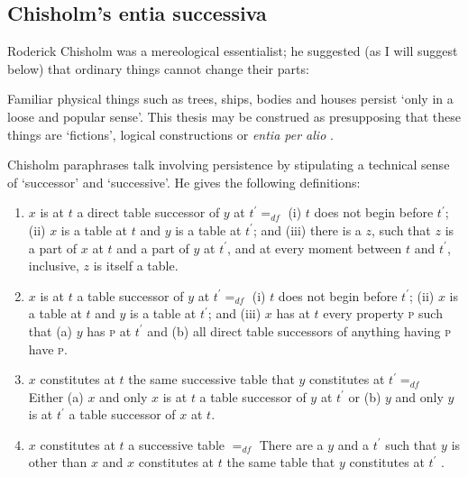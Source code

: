 \documentclass[11pt]{article}
\newenvironment{squote}{%
\begin{spacing}{1}
\begin{list}{}{%
\setlength{\labelwidth}{0pt}%
\rightmargin\leftmargin%
}
\item\relax
}{%
\end{list}%
\end{spacing}
}
\begin{document}
\begin{spacing}{1.5}
\subsection{Chisholm's entia successiva}
\label{chisholm}
Roderick Chisholm was a mereological essentialist; he suggested (as I
will suggest below) that ordinary things cannot change their parts:

\begin{squote}
Familiar physical things such as trees, ships, bodies and houses
persist `only in a loose and popular sense'.  This thesis may be
construed as presupposing that these things are `fictions', logical
constructions or {\em entia per alio} \citeyearpar[97]{chisholm1979}.
\end{squote}

Chisholm paraphrases talk involving persistence by stipulating a
technical sense of `successor' and `successive'.  He gives the
following definitions:

\begin{enumerate}[ref=(\arabic*)]
  \item $x$ is at $t$ a direct table successor of $y$ at $t^{\prime}
    =_{df}$ (i) $t$ does not begin before $t^{\prime}$; (ii) $x$ is a
    table at $t$ and $y$ is a table at $t^{\prime}$; and (iii) there
    is a $z$, such that $z$ is a part of $x$ at $t$ and a part of $y$
    at $t^{\prime}$, and at every moment between $t$ and $t^{\prime}$,
    inclusive, $z$ is itself a table.
  \item $x$ is at $t$ a table successor of $y$ at $t^{\prime} =_{df}$
    (i) $t$ does not begin before $t^{\prime}$; (ii) $x$ is a table at
    $t$ and $y$ is a table at $t^{\prime}$; and (iii) $x$ has at $t$
    every property \textsc{p} such that (a) $y$ has \textsc{p} at
    $t^{\prime}$ and (b) all direct table successors of anything
    having \textsc{p} have \textsc{p}.
  \item $x$ constitutes at $t$ the same successive table that $y$
    constitutes at $t^{\prime} =_{df}$ Either (a) $x$ and only $x$ is
    at $t$ a table successor of $y$ at $t^{\prime}$ or (b) $y$ and
    only $y$ is at $t^{\prime}$ a table successor of $x$ at $t$.
  \item $x$ constitutes at $t$ a successive table $=_{df}$ There are a
    $y$ and a $t^{\prime}$ such that $y$ is other than $x$ and $x$
    constitutes at $t$ the same table that $y$ constitutes at
    $t^{\prime}$ \citep[99--100]{chisholm1979}.
\end{enumerate}


\end{spacing}
\end{document}
